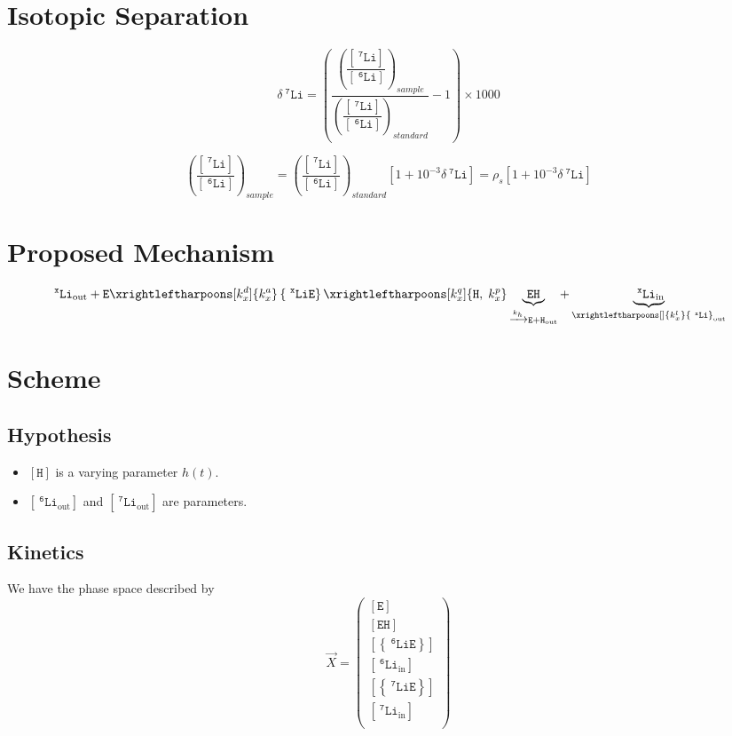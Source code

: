 \documentclass[aps,onecolumn,12pt]{revtex4}
\newcommand{\mychem}[1]{\mathtt{#1}}
\newcommand{\myconc}[1]{\left\lbrack{#1}\right\rbrack}
\newcommand{\spLi}[1]{{~^{\mychem{#1}}\mychem{Li}}}
\newcommand{\Li}[1]{\myconc{\spLi{#1}}}
\newcommand{\spEout}{\mychem{E}}
\newcommand{\Eout}{\myconc{\spEout}}
\newcommand{\spLiE}[1]{\left\lbrace\spLi{#1}\spEout\right\rbrace}
\newcommand{\LiE}[1]{\myconc{\spLiE{#1}}}
\newcommand{\spLiIn}[1]{{\spLi{#1}}_{\mathrm{in}}}
\newcommand{\LiIn}[1]{\myconc{\spLiIn{#1}}}
\newcommand{\spLiOut}[1]{{\spLi{#1}}_{\mathrm{out}}}
\newcommand{\LiOut}[1]{\myconc{\spLiOut{#1}}}
\newcommand{\spEHin}{\mychem{EH}}
\newcommand{\EHin}{\myconc{\spEHin}}
\newcommand{\spproton}{\mychem{H}}
\newcommand{\proton}{\myconc{\spproton}}
\newcommand{\deltaLi}{ {\delta\!\!\!\spLi{7}} }
\begin{document}
\section{Isotopic Separation}
$$
	\deltaLi = \left(
		\dfrac{\left(\dfrac{\Li{7}}{\Li{6}}\right)_{sample}}
		{\left(\dfrac{\Li{7}}{\Li{6}}\right)_{standard}}
		 -1 
	\right) \times 1000
$$

$$
	\left(\dfrac{\Li{7}}{\Li{6}}\right)_{sample} = \left(\dfrac{\Li{7}}{\Li{6}}\right)_{standard} \left[1+10^{-3}\deltaLi\right] = \rho_s \left[1+10^{-3}\deltaLi\right]
$$


\section{Proposed Mechanism}

\begin{equation}
	 \spLiOut{x} +  \spEout  
	 \xrightleftharpoons[k_x^d]{k_x^a} 
	 \spLiE{x}
	  \xrightleftharpoons[k_x^q]{\mychem{H},\;k_x^p} \underbrace{\spEHin}_{\xrightarrow[]{k_h} \mychem{E} + \mychem{H}_{\mathrm{out}}} + \underbrace{\spLiIn{x}}_{\xrightleftharpoons[]{k_x^l} \spLiOut{x}}
\end{equation}

\section{Scheme}

\subsection{Hypothesis}
\begin{itemize}
\item $\proton$ is a  varying parameter $h(t)$.
\item $\LiOut{6}$ and  $\LiOut{7}$ are parameters.
\end{itemize}

\subsection{Kinetics}
We have the phase space described by
\begin{equation}
 \vec{X} = 
        \begin{pmatrix}
        \Eout\\
        \EHin\\
        \LiE{6}\\
        \LiIn{6}\\
        \LiE{7}\\
        \LiIn{7}\\
        \end{pmatrix}
\end{equation}
\end{document}
